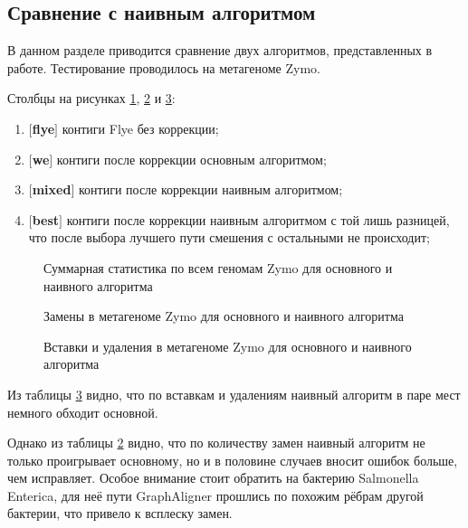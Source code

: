 \documentclass[14pt]{matmex-diploma-custom}
\begin{document}
\subsection{Сравнение с наивным алгоритмом}
В данном разделе приводится сравнение двух алгоритмов, представленных в работе. Тестирование проводилось на метагеноме Zymo.

Столбцы на рисунках \ref{fig:general_mix}, \ref{fig:mismatches_mix} и \ref{fig:indels_mix}:
\begin{enumerate}
    \item $[$\textbf{flye}$]$ контиги Flye без коррекции;
    \item $[$\textbf{we}$]$ контиги после коррекции основным алгоритмом;
    \item $[$\textbf{mixed}$]$ контиги после коррекции наивным алгоритмом;
    \item $[$\textbf{best}$]$ контиги после коррекции наивным алгоритмом с той лишь разницей, что после выбора лучшего пути смешения с остальными не происходит;
\end{enumerate}

\begin{figure}[h!]
    \centering
    
    \caption{Суммарная статистика по всем геномам Zymo для основного и наивного алгоритма}
    \label{fig:general_mix}
\end{figure}

\begin{figure}[h!]
    \centering
    
    \caption{Замены в метагеноме Zymo для основного и наивного алгоритма}
    \label{fig:mismatches_mix}
\end{figure}

\begin{figure}[h!]
    \centering
    
    \caption{Вставки и удаления в метагеноме Zymo для основного и наивного алгоритма}
    \label{fig:indels_mix}
\end{figure}

Из таблицы \ref{fig:indels_mix} видно, что по вставкам и удалениям наивный алгоритм в паре мест немного обходит основной.

Однако из таблицы \ref{fig:mismatches_mix} видно, что по количеству замен наивный алгоритм не только проигрывает основному, но и в половине случаев вносит ошибок больше, чем исправляет. Особое внимание стоит обратить на бактерию Salmonella Enterica, для неё пути GraphAligner прошлись по похожим рёбрам другой бактерии, что привело к всплеску замен.
\end{document}
